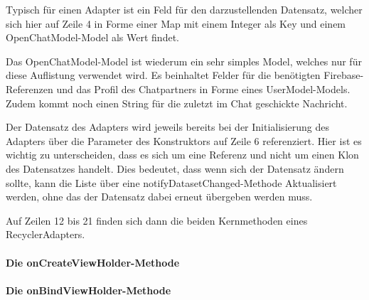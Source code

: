 \documentclass[../main.tex]{subfiles}
\begin{document}
	Typisch für einen Adapter ist ein Feld für den darzustellenden Datensatz, welcher sich hier auf Zeile 4 in Forme einer Map mit einem Integer als Key und einem OpenChatModel-Model als Wert findet. 
	
	Das OpenChatModel-Model ist wiederum ein sehr simples Model, welches nur für diese Auflistung verwendet wird. Es beinhaltet Felder für die benötigten Firebase-Referenzen und das Profil des Chatpartners in Forme eines UserModel-Models. Zudem kommt noch einen String für die zuletzt im Chat geschickte Nachricht.
	
	Der Datensatz des Adapters wird jeweils bereits bei der Initialisierung des Adapters über die Parameter des Konstruktors auf Zeile 6 referenziert. Hier ist es wichtig zu unterscheiden, dass es sich um eine Referenz und nicht um einen Klon des Datensatzes handelt. Dies bedeutet, dass wenn sich der Datensatz ändern sollte, kann die Liste über eine notifyDatasetChanged-Methode Aktualisiert werden, ohne das der Datensatz dabei erneut übergeben werden muss.
	
	Auf Zeilen 12 bis 21 finden sich dann die beiden Kernmethoden eines RecyclerAdapters.
	
	\paragraph{Die onCreateViewHolder-Methode}
	
	\paragraph{Die onBindViewHolder-Methode}
	
	
	
\end{document}
